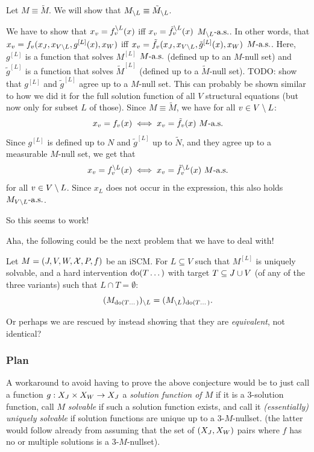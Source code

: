 \begin{Rem}\label{rem:scm_marginalization2}
  Let $M \equiv \tilde{M}$.
  We will show that $M_{\setminus L} \equiv \tilde{M}_{\setminus L}$.

  We have to show that $x_v = f^{\setminus L}_v(x)$ iff $x_v = \tilde{f}^{\setminus L}_v(x)$ $M_{\setminus L}\text{-a.s.}$.
  In other words, that
  $x_v = f_v(x_J,x_{V\setminus L},g^{[L]}(x),x_W)$ iff $x_v = \tilde{f}_v(x_J,x_{V\setminus L},\tilde{g}^{[L]}(x),x_W)$ $M\text{-a.s.}$.
  Here, $g^{[L]}$ is a function that solves $M^{[L]}$ $M\text{-a.s.}$ (defined up to an $M$-null set) and $\tilde{g}^{[L]}$ is a function that solves $\tilde{M}^{[L]}$ (defined up to a $\tilde{M}$-null set).
  TODO: show that $g^{[L]}$ and $\tilde{g}^{[L]}$ agree up to a $M$-null set.
  This can probably be shown similar to how we did it for the full solution function of all $V$ structural equations (but now only for subset $L$ of those).
  Since $M \equiv \tilde{M}$, we have for all $v \in V\setminus L$:
  $$x_v = f_v(x) \iff x_v = \tilde{f}_v(x)\ M\as$$
  Since $g^{[L]}$ is defined up to $N$ and $\tilde{g}^{[L]}$ up to $\tilde{N}$, and they agree up to a measurable $M$-null set, we get that
  $$x_v = f_v^{\setminus L}(x) \iff x_v = \tilde{f}_v^{\setminus L}(x)\ M\text{-a.s.}$$
  for all $v \in V\setminus L$.
  Since $x_L$ does not occur in the expression, this also holds $M_{V\setminus L}\text{-a.s.}$.

  So this seems to work!
\end{Rem}

Aha, the following could be the next problem that we have to deal with!
\begin{Prp}\label{prp:interventions_marginalizations_commute}
Let $M = \left ( J, V, W, \mathcal{X}, P, f \right )$ be an iSCM.
    For $L \subseteq V$ such that $M^{[L]}$ is uniquely solvable,
    and a hard intervention $\operatorname{do}(T\dots)$ with target $T \subseteq J \cup V$ (of any of the three variants) such that $L \cap T = \emptyset$:
    $$(M_{\operatorname{do}(T\dots)})_{\setminus L} = (M_{\setminus L})_{\operatorname{do}(T\dots)}.$$
\end{Prp}
Or perhaps we are rescued by instead showing that they are \emph{equivalent}, not identical?

\subsubsection{Plan}
A workaround to avoid having to prove the above conjecture would be to just call a function $g : X_{J} \times X_{W} \to X_{J}$ a \emph{solution function of $M$} if it is a 3-solution function, call $M$ \emph{solvable} if such a solution function exists, and call it \emph{(essentially) uniquely solvable} if solution functions are unique up to a 3-$M$-nullset.
(the latter would follow already from assuming that the set of $(X_{J},X_{W})$ pairs where $f$ has no or multiple solutions is a 3-$M$-nullset).

